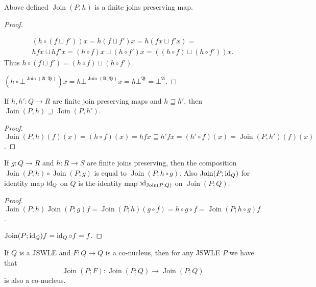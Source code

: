 \begin{lem}
Above defined $\operatorname{Join}(P,h)$ is a finite joins preserving
map.\end{lem}
\begin{proof}
~

\begin{multline*}
(h\circ(f\sqcup f'))x=h(f\sqcup f')x=h(fx\sqcup f'x)=\\
hfx\sqcup hf'x=(h\circ f)x\sqcup(h\circ f')x=((h\circ f)\sqcup(h\circ f'))x.
\end{multline*}
Thus $h\circ(f\sqcup f')=(h\circ f)\sqcup(h\circ f')$.

$(h\circ\bot^{\operatorname{Join}(\mathfrak{A};\mathfrak{B})})x=h\bot^{\operatorname{Join}(\mathfrak{A};\mathfrak{B})}x=h\bot^{\mathfrak{B}}=\bot^{\mathfrak{A}}$.\end{proof}
\begin{prop}
If $h,h':Q\rightarrow R$ are finite join preserving maps and $h\sqsupseteq h'$,
then $\operatorname{Join}(P,h)\sqsupseteq\operatorname{Join}(P,h')$.\end{prop}
\begin{proof}
$\operatorname{Join}(P,h)(f)(x)=(h\circ f)(x)=hfx\sqsupseteq h'fx=(h'\circ f)(x)=\operatorname{Join}(P,h')(f)(x)$.\end{proof}
\begin{lem}
If $g:Q\rightarrow R$ and $h:R\rightarrow S$ are finite joins preserving,
then the composition $\operatorname{Join}(P;h)\circ\operatorname{Join}(P;g)$
is equal to $\operatorname{Join}(P;h\circ g)$. Also $\operatorname{Join}(P;\operatorname{id}_{Q})$
for identity map $\operatorname{id}_{Q}$ on $Q$ is the identity map $\operatorname{id}_{\operatorname{Join}(P;Q)}$
on $\operatorname{Join}(P;Q)$.\end{lem}
\begin{proof}
$\operatorname{Join}(P;h)\operatorname{Join}(P;g)f=\operatorname{Join}(P;h)(g\circ f)=h\circ g\circ f=\operatorname{Join}(P;h\circ g)f$.

$\operatorname{Join}(P;\operatorname{id}_{Q})f=\operatorname{id}_{Q}\circ f=f$.\end{proof}
\begin{cor}
\label{join-map-co-nucleus}If $Q$ is a JSWLE and $F:Q\rightarrow Q$
is a co-nucleus, then for any JSWLE $P$ we have that 
\[
\operatorname{Join}(P;F):\operatorname{Join}(P;Q)\rightarrow\operatorname{Join}(P;Q)
\]
 is also a co-nucleus.\end{cor}
